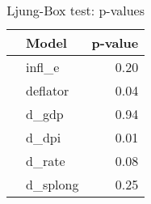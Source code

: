 \begin{table}[ht]
  \caption{Ljung-Box test: p-values}
  \label{tab:ljungbox}
\centering
\begin{tabular}{rlr}
  \hline
 & Model & p-value \\ 
  \hline
 & infl\_e & 0.20 \\ 
   & deflator & 0.04 \\ 
   & d\_gdp & 0.94 \\ 
   & d\_dpi & 0.01 \\ 
   & d\_rate & 0.08 \\ 
   & d\_splong & 0.25 \\ 
   \hline
\end{tabular}
\end{table}
